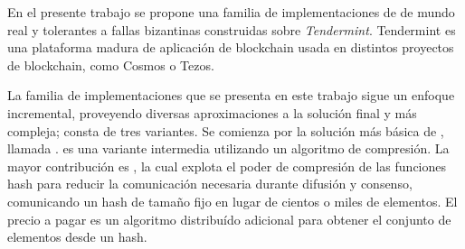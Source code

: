   En el presente trabajo se propone una familia de implementaciones de \setchain 
  de mundo real y tolerantes a fallas bizantinas construidas sobre \textit{Tendermint}.
  Tendermint es una plataforma madura de aplicación de blockchain usada en distintos
  proyectos de blockchain, como Cosmos o Tezos. 
  
  La familia de implementaciones que se presenta en este trabajo sigue un enfoque
  incremental, proveyendo diversas aproximaciones a la solución final y más compleja;
  consta de tres variantes.
  Se comienza por la solución más básica de \setchain, llamada \vanilla.
  \compresschain es una variante intermedia utilizando un algoritmo de compresión.
  La mayor contribución es \hashchain, la cual explota el poder de compresión de las
  funciones hash para reducir la comunicación necesaria durante difusión y consenso,
  comunicando un hash de tamaño fijo en lugar de cientos o miles de elementos.
  El precio a pagar es un algoritmo distribuído adicional para obtener el conjunto de
  elementos desde un hash.


